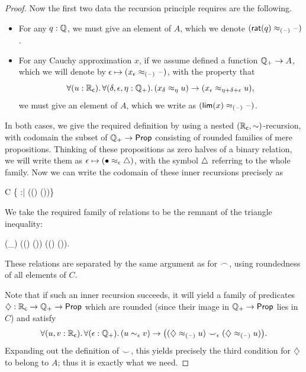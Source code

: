 \begin{proof}
  Now the first two data the recursion principle requires are the following.
  \begin{itemize}
  \item For any $q:\mathbb{Q}$, we must give an element of $A$, which we denote $(\mathsf{rat}(q)\approx_{(\mathord{\hspace{1pt}\text{--}\hspace{1pt}})} \mathord{\hspace{1pt}\text{--}\hspace{1pt}})$.
  \item For any Cauchy approximation $x$, if we assume defined a function $\mathbb{Q}_{+} \to A$, which we will denote by $\epsilon \mapsto (x_\epsilon \approx_{(\mathord{\hspace{1pt}\text{--}\hspace{1pt}})} \mathord{\hspace{1pt}\text{--}\hspace{1pt}})$, with the property that
    \begin{equation}
      \fall{u:\RC}{\delta,\epsilon,\eta:\Qp} (x_\delta \approx_\eta u) \to (x_\epsilon \approx_{\eta+\delta+\epsilon} u),\label{eq:appxrec2}
    \end{equation}
    we must give an element of $A$, which we write as $(\mathsf{lim}(x)\approx_{(\mathord{\hspace{1pt}\text{--}\hspace{1pt}})} \mathord{\hspace{1pt}\text{--}\hspace{1pt}})$.
  \end{itemize}
  In both cases, we give the required definition by using a nested $(\mathbb{R}_\mathsf{c},\mathord\sim)$-recursion, with codomain the subset of $\mathbb{Q}_{+}\to\mathsf{Prop}$ consisting of rounded families of mere propositions.
  Thinking of these propositions as zero halves of a binary relation, we will write them as $\epsilon \mapsto (\bullet\approx_{\epsilon}\triangle)$, with the symbol $\triangle$ referring to the whole family.
  Now we can write the codomain of these inner recursions precisely as
  \begin{narrowmultline*}
    C 
    \bigg\{ \tapname :\Qp\to\prop \;\;\Big|\;\; \narrowbreak
    \fall{\epsilon:\Qp} \Big((\tap\epsilon) \Leftrightarrow \exis{\theta:\Qp} (\tap{\epsilon-\theta})\Big)\bigg\}
  \end{narrowmultline*}
  We take the required family of relations to be the remnant of the triangle inequality:
  \begin{narrowmultline*}
    (\tapname \bbsim_\epsilon \tapbname) 
    \fall{\eta:\Qp} ((\tap\eta) \to (\tapb{\epsilon+\eta})) \land
    \narrowbreak
    ((\tapb\eta) \to (\tap{\epsilon+\eta})).
  \end{narrowmultline*}
  These relations are separated by the same argument as for $\frown$, using roundedness of all elements of $C$.

  Note that if such an inner recursion succeeds, it will yield a family of predicates $\diamondsuit : \mathbb{R}_\mathsf{c}\to\mathbb{Q}_{+}\to \mathsf{Prop}$ which are rounded
(since their image in $\mathbb{Q}_{+}\to\mathsf{Prop}$ lies in $C$) and satisfy
  \[ \fall{u,v:\RC}{\epsilon:\Qp} (u\close\epsilon v) \to \big((\hapx_{(\blank)} u) \bbsim_\epsilon (\hapx_{(\blank)} u)\big). \]
  Expanding out the definition of $\smile$, this yields precisely the third condition for $\diamondsuit$ to belong to $A$; thus it is exactly what we need.


\end{proof}

